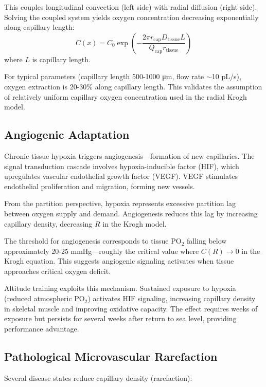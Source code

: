 This couples longitudinal convection (left side) with radial diffusion (right side). Solving the coupled system yields oxygen concentration decreasing exponentially along capillary length:
\begin{equation}
C(x) = C_{0} \exp\left(-\frac{2\pi r_{\mathrm{cap}} D_{\mathrm{tissue}} L}{Q_{\mathrm{cap}} r_{\mathrm{tissue}}}\right)
\end{equation}
where $L$ is capillary length.

For typical parameters (capillary length 500-1000 μm, flow rate $\sim$10 pL/s), oxygen extraction is 20-30\% along capillary length. This validates the assumption of relatively uniform capillary oxygen concentration used in the radial Krogh model.

\subsection{Angiogenic Adaptation}

Chronic tissue hypoxia triggers angiogenesis—formation of new capillaries. The signal transduction cascade involves hypoxia-inducible factor (HIF), which upregulates vascular endothelial growth factor (VEGF). VEGF stimulates endothelial proliferation and migration, forming new vessels.

From the partition perspective, hypoxia represents excessive partition lag between oxygen supply and demand. Angiogenesis reduces this lag by increasing capillary density, decreasing $R$ in the Krogh model.

The threshold for angiogenesis corresponds to tissue PO$_{2}$ falling below approximately 20-25 mmHg—roughly the critical value where $C(R) \to 0$ in the Krogh equation. This suggests angiogenic signaling activates when tissue approaches critical oxygen deficit.

Altitude training exploits this mechanism. Sustained exposure to hypoxia (reduced atmospheric PO$_{2}$) activates HIF signaling, increasing capillary density in skeletal muscle and improving oxidative capacity. The effect requires weeks of exposure but persists for several weeks after return to sea level, providing performance advantage.

\subsection{Pathological Microvascular Rarefaction}

Several disease states reduce capillary density (rarefaction):

